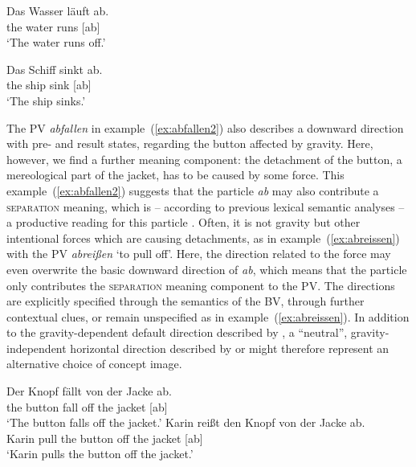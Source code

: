 \documentclass[output=paper]{langsci/langscibook}
\begin{document}
\ea\label{ex:ablaufen}
\gll Das Wasser läuft ab.\\
the water runs [ab]\\
\glt `The water runs off.'

\ex\label{ex:absinken}
\gll Das Schiff sinkt ab.\\
the ship sink [ab]\\
\glt `The ship sinks.'
\z
  
The PV \textit{abfallen} in example~(\ref{ex:abfallen2}) also
describes a downward direction with pre- and result states, regarding
the button affected by gravity. Here, however, we find a further meaning
component: the detachment of the button, a mereological part of the
jacket, has to be caused by some force. This
example~(\ref{ex:abfallen2}) suggests that the particle \textit{ab} may
also contribute a \textsc{separation} meaning, which is -- according to
previous lexical semantic analyses -- a productive reading for this
particle \citep{Kliche:11}. Often, it is not gravity but other
intentional forces which are causing detachments, as in
example~(\ref{ex:abreissen}) with the PV \textit{abreißen} `to pull
off'. Here, the direction related to the force may even overwrite the
basic downward direction of \textit{ab}, which means that the particle
only contributes the \textsc{separation} meaning component to the
PV. The directions are explicitly specified through the semantics of
the BV, through further contextual clues, or remain unspecified as in
example~(\ref{ex:abreissen}). In addition to the gravity-dependent
default direction described by , a ``neutral'',
gravity-independent horizontal direction described by
 or  might therefore represent an
alternative choice of concept image.

\ea\label{ex:abfallen2}
\gll Der Knopf fällt von der Jacke ab.\\
the button fall off the jacket [ab]\\
\glt `The button falls off the jacket.'  
\ex \label{ex:abreissen}
\gll Karin reißt den Knopf von der Jacke ab.\\
Karin pull the button off the jacket [ab]\\
\glt `Karin pulls the button off the jacket.'
\z
\end{document}
